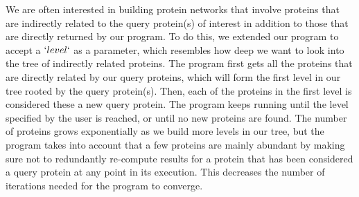 \documentclass{ucetd}
\begin{document}
We are often interested in building protein networks that involve proteins that are indirectly related to the query protein(s) of interest in addition to those that are directly returned by our program. 
To do this, we extended our program to accept a $`level`$ as a parameter, which resembles how deep we want to  look into the tree of indirectly related proteins. The program first gets all the proteins that are directly related by our query proteins, which will form the first level in our tree rooted by the query protein(s). Then, each of the proteins in the first level is considered these a new query protein. The program keeps running until the level specified by the user is reached, or until no new proteins are found. The number of proteins grows exponentially as we build more levels in our tree, but the program takes into account that a few proteins are mainly abundant by making sure not to redundantly re-compute results for a protein that has been considered a query protein at any point in its execution. This decreases the number of iterations needed for the program to converge. 
\end{document}
